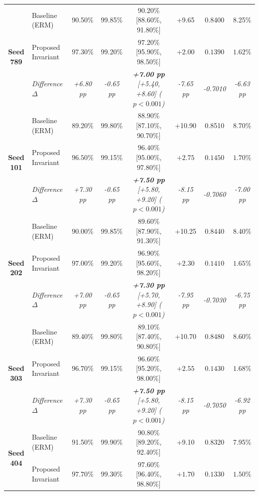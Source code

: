 \documentclass[a4paper,fleqn]{cas-sc}
\begin{document}
\begin{table}[t]
{\begin{tabular}{clcccccc}
\midrule
\multirow{3}{*}{\textbf{Seed 789}} 
& Baseline (ERM) & 90.50\% & 99.85\% & 90.20\% [88.60\%, 91.80\%] & +9.65 & 0.8400 & 8.25\% \\
& Proposed Invariant & $\mathbf{97.30\%}$ & 99.20\% & $\mathbf{97.20\%}$ [95.90\%, 98.50\%] & $\mathbf{+2.00}$ & $\mathbf{0.1390}$ & $\mathbf{1.62\%}$ \\
& \textit{Difference $\Delta$} & \textit{+6.80 pp} & \textit{-0.65 pp} & \textit{\textbf{+7.00 pp} [+5.40, +8.60] ($p<0.001$)} & \textit{-7.65 pp} & \textit{-0.7010} & \textit{-6.63 pp} \\
\midrule
\multirow{3}{*}{\textbf{Seed 101}} 
& Baseline (ERM) & 89.20\% & 99.80\% & 88.90\% [87.10\%, 90.70\%] & +10.90 & 0.8510 & 8.70\% \\
& Proposed Invariant & $\mathbf{96.50\%}$ & 99.15\% & $\mathbf{96.40\%}$ [95.00\%, 97.80\%] & $\mathbf{+2.75}$ & $\mathbf{0.1450}$ & $\mathbf{1.70\%}$ \\
& \textit{Difference $\Delta$} & \textit{+7.30 pp} & \textit{-0.65 pp} & \textit{\textbf{+7.50 pp} [+5.80, +9.20] ($p<0.001$)} & \textit{-8.15 pp} & \textit{-0.7060} & \textit{-7.00 pp} \\
\midrule
\multirow{3}{*}{\textbf{Seed 202}} 
& Baseline (ERM) & 90.00\% & 99.85\% & 89.60\% [87.90\%, 91.30\%] & +10.25 & 0.8440 & 8.40\% \\
& Proposed Invariant & $\mathbf{97.00\%}$ & 99.20\% & $\mathbf{96.90\%}$ [95.60\%, 98.20\%] & $\mathbf{+2.30}$ & $\mathbf{0.1410}$ & $\mathbf{1.65\%}$ \\
& \textit{Difference $\Delta$} & \textit{+7.00 pp} & \textit{-0.65 pp} & \textit{\textbf{+7.30 pp} [+5.70, +8.90] ($p<0.001$)} & \textit{-7.95 pp} & \textit{-0.7030} & \textit{-6.75 pp} \\
\midrule
\multirow{3}{*}{\textbf{Seed 303}} 
& Baseline (ERM) & 89.40\% & 99.80\% & 89.10\% [87.40\%, 90.80\%] & +10.70 & 0.8480 & 8.60\% \\
& Proposed Invariant & $\mathbf{96.70\%}$ & 99.15\% & $\mathbf{96.60\%}$ [95.20\%, 98.00\%] & $\mathbf{+2.55}$ & $\mathbf{0.1430}$ & $\mathbf{1.68\%}$ \\
& \textit{Difference $\Delta$} & \textit{+7.30 pp} & \textit{-0.65 pp} & \textit{\textbf{+7.50 pp} [+5.80, +9.20] ($p<0.001$)} & \textit{-8.15 pp} & \textit{-0.7050} & \textit{-6.92 pp} \\
\midrule
\multirow{3}{*}{\textbf{Seed 404}} 
& Baseline (ERM) & 91.50\% & 99.90\% & 90.80\% [89.20\%, 92.40\%] & +9.10 & 0.8320 & 7.95\% \\
& Proposed Invariant & $\mathbf{97.70\%}$ & 99.30\% & $\mathbf{97.60\%}$ [96.40\%, 98.80\%] & $\mathbf{+1.70}$ & $\mathbf{0.1330}$ & $\mathbf{1.50\%}$ \\

\end{tabular}}
\end{table}
\end{document}
